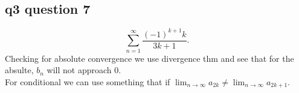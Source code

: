 \subsection*{q3 question 7}%
\label{sub:q3 question 7}
\[
\sum_{ n=1 } ^{ \infty } \frac{ \left( -1 \right) ^{ k+1 }k }{ 3k+1 }
.\] 
Checking for absolute convergence we use divergence thm and see that for the absulte, $ b_n $ will not approach 0.\\
For conditional we can use something that if $ \lim_{ n \to \infty} a_{ 2k }\neq \lim_{ n \to \infty} a_{ 2k+1 } $. 
